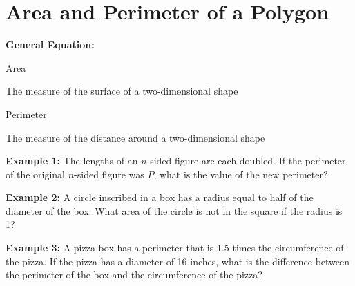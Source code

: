\section{Area and Perimeter of a Polygon}
\textbf{General Equation:}

\begin{center}
\begin{multicols}{2}
Area

The measure of the surface of a two-dimensional shape

Perimeter

The measure of the distance around a two-dimensional shape
\end{multicols}
\end{center}

\vfill\textbf{Example 1:} The lengths of an $n$-sided figure are each doubled. If the perimeter of the original $n$-sided figure was $P$, what is the value of the new perimeter?

\vfill\textbf{Example 2:} A circle inscribed in a box has a radius equal to half of the diameter of the box. What area of the circle is not in the square if the radius is 1?

\vfill\textbf{Example 3:} A pizza box has a perimeter that is 1.5 times the circumference of the pizza. If the pizza has a diameter of 16 inches, what is the difference between the perimeter of the box and the circumference of the pizza?

\vfill
\newpage
\setlength{\columnseprule}{1pt}
\begin{multicols*}{2}
\pagebreak
\end{multicols*}